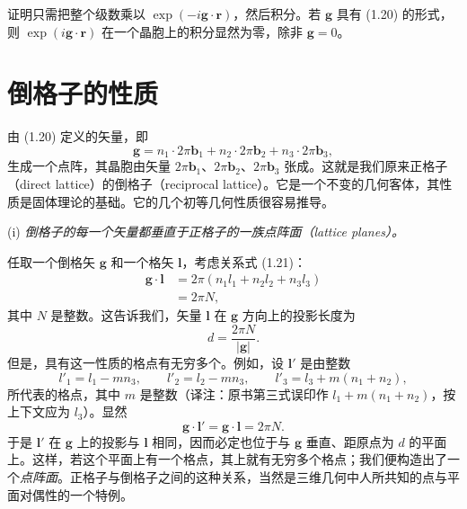 证明只需把整个级数乘以 $\exp(-i\boldsymbol{g}\cdot\mathbf{r})$，然后积分。若 $\boldsymbol{g}$ 具有 (1.20) 的形式，则 $\exp(i\boldsymbol{g}\cdot\mathbf{r})$ 在一个晶胞上的积分显然为零，除非 $\boldsymbol{g}=0$。

\section{倒格子的性质}

由 (1.20) 定义的矢量，即
\begin{equation*}
\boldsymbol{g} = n_1\cdot 2\pi\mathbf{b}_1 + n_2\cdot 2\pi\mathbf{b}_2 + n_3\cdot 2\pi\mathbf{b}_3,
\tag{1.23}
\end{equation*}
生成一个点阵，其晶胞由矢量 $2\pi\mathbf{b}_1$、$2\pi\mathbf{b}_2$、$2\pi\mathbf{b}_3$ 张成。这就是我们原来正格子（direct lattice）的倒格子（reciprocal lattice）。它是一个不变的几何客体，其性质是固体理论的基础。它的几个初等几何性质很容易推导。

(i) \emph{倒格子的每一个矢量都垂直于正格子的一族点阵面（lattice planes）。}

任取一个倒格矢 $\boldsymbol{g}$ 和一个格矢 $\boldsymbol{l}$，考虑关系式 (1.21)：
\begin{align*}
\boldsymbol{g}\cdot\boldsymbol{l} &= 2\pi(n_1 l_1 + n_2 l_2 + n_3 l_3) \\
&= 2\pi N,
\tag{1.24}
\end{align*}
其中 $N$ 是整数。这告诉我们，矢量 $\boldsymbol{l}$ 在 $\boldsymbol{g}$ 方向上的投影长度为
\begin{equation*}
d = \frac{2\pi N}{|\boldsymbol{g}|}.
\tag{1.25}
\end{equation*}
但是，具有这一性质的格点有无穷多个。例如，设 $\boldsymbol{l}'$ 是由整数
\begin{equation*}
l'_1 = l_1 - mn_3, \qquad l'_2 = l_2 - mn_3, \qquad l'_3 = l_3 + m(n_1+n_2),
\tag{1.26}
\end{equation*}
所代表的格点，其中 $m$ 是整数（译注：原书第三式误印作 $l_1+m(n_1+n_2)$，按上下文应为 $l_3$）。显然
\begin{equation*}
\boldsymbol{g}\cdot\boldsymbol{l}' = \boldsymbol{g}\cdot\boldsymbol{l} = 2\pi N.
\tag{1.27}
\end{equation*}
于是 $\boldsymbol{l}'$ 在 $\boldsymbol{g}$ 上的投影与 $\boldsymbol{l}$ 相同，因而必定也位于与 $\boldsymbol{g}$ 垂直、距原点为 $d$ 的平面上。这样，若这个平面上有一个格点，其上就有无穷多个格点；我们便构造出了一个\emph{点阵面}。正格子与倒格子之间的这种关系，当然是三维几何中人所共知的点与平面对偶性的一个特例。

